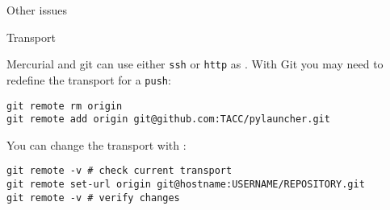  {Other issues}

 {Transport}

Mercurial and git can use either \texttt{ssh} or \texttt{http} as
%
%
.
With Git you may need to redefine the transport for a \texttt{push}:
\begin{verbatim}
git remote rm origin
git remote add origin git@github.com:TACC/pylauncher.git
\end{verbatim}

You can change the transport with :
\begin{verbatim}
git remote -v # check current transport
git remote set-url origin git@hostname:USERNAME/REPOSITORY.git
git remote -v # verify changes
\end{verbatim}

\endinput

$ git config --global user.name "Vlad Dracula"
$ git config --global user.email "vlad@tran.sylvan.ia"

git config --global init.defaultBranch main





